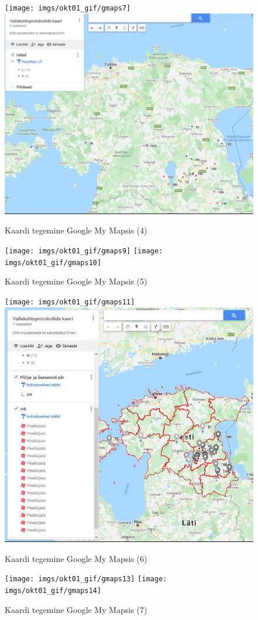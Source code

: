 \documentclass[
]{book}
\begin{document}
\begin{figure}

{\centering \texttt{[image: imgs/okt01\_gif/gmaps7]} \includegraphics[width=0.5\linewidth,height=1\textheight]{imgs/okt01_gif/gmaps8} 

}

\caption{Kaardi tegemine Google My Mapsis (4)}\label{fig:mymaps4}
\end{figure}

\begin{figure}

{\centering \texttt{[image: imgs/okt01\_gif/gmaps9]} \texttt{[image: imgs/okt01\_gif/gmaps10]} 

}

\caption{Kaardi tegemine Google My Mapsis (5)}\label{fig:mymaps5}
\end{figure}

\begin{figure}

{\centering \texttt{[image: imgs/okt01\_gif/gmaps11]} \includegraphics[width=0.5\linewidth,height=1\textheight]{imgs/okt01_gif/gmaps12} 

}

\caption{Kaardi tegemine Google My Mapsis (6)}\label{fig:mymaps6}
\end{figure}

\begin{figure}

{\centering \texttt{[image: imgs/okt01\_gif/gmaps13]} \texttt{[image: imgs/okt01\_gif/gmaps14]} 

}

\caption{Kaardi tegemine Google My Mapsis (7)}\label{fig:mymaps7}
\end{figure}
\end{document}
